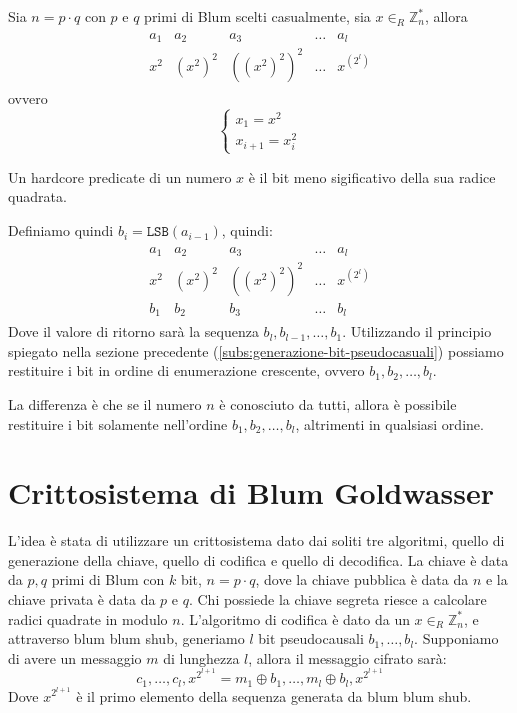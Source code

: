 Sia $n = p \cdot q$ con $p$ e $q$ primi di Blum scelti casualmente, sia 
$x \in_R \mathbb{Z}_n^*$, allora
\begin{align*}
  \begin{array}{lllll}
    a_1 & a_2 & a_3 & \dots & a_l \\
    x^2 & (x^2)^2 & ((x^2)^2)^2 & \dots & x^{(2^l)}
  \end{array}
\end{align*}
ovvero
\[
  \begin{cases}
    x_1 = x^2\\
    x_{i+1} = x_i^2
  \end{cases}  
\]
\begin{theorem}
  Un hardcore predicate di un numero $x$ è il bit meno sigificativo della sua radice quadrata.
\end{theorem}
Definiamo quindi $b_i = \texttt{LSB}(a_{i-1})$, quindi:
\begin{align*}
  \begin{array}{lllll}
    a_1 & a_2 & a_3 & \dots & a_l \\
    x^2 & (x^2)^2 & ((x^2)^2)^2 & \dots & x^{(2^l)}\\
    b_1 & b_2 & b_3 & \dots & b_l
  \end{array}
\end{align*}
Dove il valore di ritorno sarà la sequenza $b_l, b_{l-1}, \dots, b_1$.
Utilizzando il principio spiegato nella sezione precedente (\ref{subs:generazione-bit-pseudocasuali}) 
possiamo restituire i bit in ordine di enumerazione crescente, ovvero $b_1, b_2, \dots, b_l$.

La differenza è che se il numero $n$ è conosciuto da tutti, allora è possibile restituire i bit solamente 
nell'ordine $b_1, b_2, \dots, b_l$, altrimenti in qualsiasi ordine.

\section{Crittosistema di Blum Goldwasser}
L'idea è stata di utilizzare un crittosistema dato dai soliti tre algoritmi, quello di generazione 
della chiave, quello di codifica e quello di decodifica.
La chiave è data da $p, q$ primi di Blum con $k$ bit, $n = p \cdot q$, dove la chiave pubblica 
è data da $n$ e la chiave privata è data da $p$ e $q$.
Chi possiede la chiave segreta riesce a calcolare radici quadrate in modulo $n$. L'algoritmo 
di codifica è dato da un $x\in_R \mathbb{Z}_n^*$, e attraverso blum blum shub, generiamo 
$l$ bit pseudocausali $b_1, \dots, b_l$. Supponiamo di avere un messaggio $m$ di lunghezza $l$,
allora il messaggio cifrato sarà:
\[
  c_1, \dots, c_l, x^{2^{l+1}} = m_1 \oplus b_1, \dots, m_l \oplus b_l, x^{2^{l+1}}
\]
Dove $x^{2^{l+1}}$ è il primo elemento della sequenza generata da blum blum shub.

